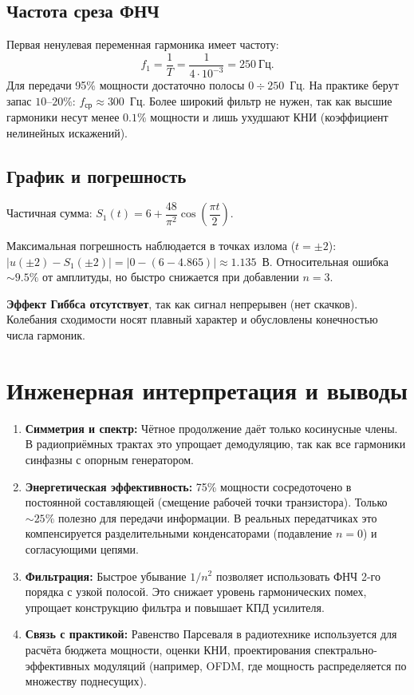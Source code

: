 \documentclass[a4paper,12pt]{article}
\begin{document}
\subsection{Частота среза ФНЧ}
Первая ненулевая переменная гармоника имеет частоту:
\[
f_1 = \frac{1}{T} = \frac{1}{4 \cdot 10^{-3}} = 250~\text{Гц}.
\]
Для передачи 95\% мощности достаточно полосы $0 \div 250$~Гц. На практике берут запас $10$--$20\%$: $f_{\text{ср}} \approx 300$~Гц. Более широкий фильтр не нужен, так как высшие гармоники несут менее $0.1\%$ мощности и лишь ухудшают КНИ (коэффициент нелинейных искажений).

\subsection{График и погрешность}
Частичная сумма: $S_1(t) = 6 + \dfrac{48}{\pi^2} \cos\left(\dfrac{\pi t}{2}\right)$.

Максимальная погрешность наблюдается в точках излома ($t=\pm 2$): 
$|u(\pm 2) - S_1(\pm 2)| = |0 - (6 - 4.865)| \approx 1.135$~В. Относительная ошибка $\sim 9.5\%$ от амплитуды, но быстро снижается при добавлении $n=3$.

\noindent\textbf{Эффект Гиббса отсутствует}, так как сигнал непрерывен (нет скачков). Колебания сходимости носят плавный характер и обусловлены конечностью числа гармоник.

\section{Инженерная интерпретация и выводы}
\begin{enumerate}[label=\arabic*.]
    \item \textbf{Симметрия и спектр:} Чётное продолжение даёт только косинусные члены. В радиоприёмных трактах это упрощает демодуляцию, так как все гармоники синфазны с опорным генератором.
    
    \item \textbf{Энергетическая эффективность:} 75\% мощности сосредоточено в постоянной составляющей (смещение рабочей точки транзистора). Только $\sim 25\%$ полезно для передачи информации. В реальных передатчиках это компенсируется разделительными конденсаторами (подавление $n=0$) и согласующими цепями.
    
    \item \textbf{Фильтрация:} Быстрое убывание $1/n^2$ позволяет использовать ФНЧ 2-го порядка с узкой полосой. Это снижает уровень гармонических помех, упрощает конструкцию фильтра и повышает КПД усилителя.
    
    \item \textbf{Связь с практикой:} Равенство Парсеваля в радиотехнике используется для расчёта бюджета мощности, оценки КНИ, проектирования спектрально-эффективных модуляций (например, OFDM, где мощность распределяется по множеству поднесущих).
\end{enumerate}
\end{document}
